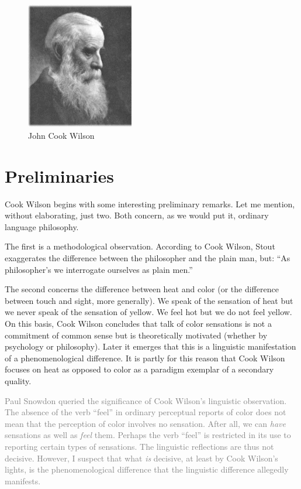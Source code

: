 \documentclass[11pt]{article}
\title{\mytitle\\
\mysubtitle}
\author{\myauthor}
\date{} %
\newcommand{\discuss}[2][gray]{\textcolor{#1}{#2}}
\begin{document}
\maketitle

\setlength{\parindent}{1em}


\begin{figure}[htbp]
	\centering
		\includegraphics[scale=1]{../graphics/wilson.jpg}
	\caption{John Cook Wilson}
	\label{fig:wilson}
\end{figure}

\section{Preliminaries} %
\label{sec:preliminaries}

Cook Wilson begins with some interesting preliminary remarks. Let me mention, without elaborating, just two. Both concern, as we would put it, ordinary language philosophy. 

The first is a methodological observation. According to Cook Wilson, Stout exaggerates the difference between the philosopher and the plain man, but: ``As philosopher's we interrogate ourselves as plain men.'' 

The second concerns the difference between heat and color (or the difference between touch and sight, more generally). We speak of the sensation of heat but we never speak of the sensation of yellow. We feel hot but we do not feel yellow. On this basis, Cook Wilson concludes that talk of color sensations is not a commitment of common sense but is theoretically motivated (whether by psychology or philosophy). Later it emerges that this is a linguistic manifestation of a phenomenological difference. It is partly for this reason that Cook Wilson focuses on heat as opposed to color as a paradigm exemplar of a secondary quality.

\discuss{Paul Snowdon queried the significance of Cook Wilson's linguistic observation. The absence of the verb ``feel'' in ordinary perceptual reports of color does not mean that the perception of color involves no sensation. After all, we can \emph{have} sensations as well as \emph{feel} them. Perhaps the verb ``feel'' is restricted in its use to reporting certain types of sensations. The linguistic reflections are thus not decisive. However, I suspect that what \emph{is} decisive, at least by Cook Wilson's lights, is the phenomenological difference that the linguistic difference allegedly manifests.}
\end{document}
